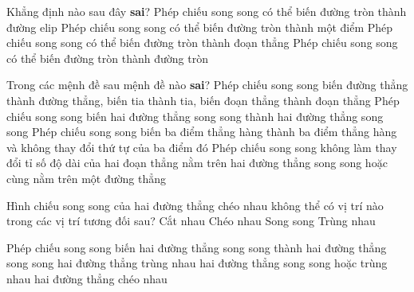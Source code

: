 \begin{ex}%
	Khẳng định nào sau  đây \textbf{sai}?
	\choice 
		{Phép chiếu song song  có thể biến đường tròn thành đường elip}
		{\True Phép chiếu song song  có thể biến đường tròn thành một điểm}
		{Phép chiếu song  song có thể biến đường tròn thành đoạn thẳng}
		{Phép chiếu song song có thể biến đường tròn thành đường  tròn}
\end{ex}

\begin{ex}%
	Trong các mệnh  đề sau mệnh đề nào \textbf{sai}?
	\choice 
		 {Phép chiếu song song biến đường thẳng thành đường thẳng, biến tia thành tia, biến đoạn thẳng thành đoạn thẳng}
		 {\True Phép chiếu song song biến hai đường thẳng song song thành hai đường thẳng song song}
		{Phép chiếu song song biến ba điểm thẳng hàng thành ba điểm thẳng hàng và không thay đổi thứ tự của ba điểm  đó}
		{Phép chiếu song song không làm thay đổi tỉ số độ dài của hai đoạn thẳng nằm trên hai đường thẳng song song hoặc cùng nằm  trên một đường thẳng}
\end{ex}

\begin{ex}%
	Hình chiếu song song của hai đường  thẳng chéo nhau không thể có vị trí nào trong các vị trí tương đối sau?
	 \choice
		 {Cắt nhau}
		{\True Chéo nhau} 
		 {Song song}
		 {Trùng nhau}
\end{ex}

\begin{ex}%
	 Phép chiếu song song biến hai đường thẳng song song thành
	\choice 
		{hai đường thẳng song song} 
		{hai  đường thẳng trùng nhau}
		{\True hai đường thẳng song  song hoặc trùng nhau}
		{hai đường thẳng chéo nhau} 
\end{ex}


